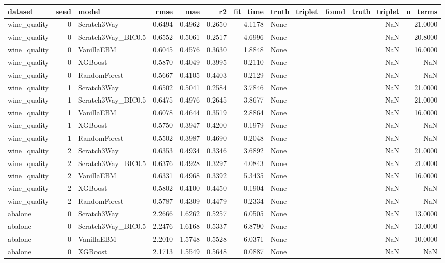 \begin{tabular}{lrlrrrrlrr}
\toprule
dataset & seed & model & rmse & mae & r2 & fit_time & truth_triplet & found_truth_triplet & n_terms \\
\midrule
wine_quality & 0 & Scratch3Way & 0.6494 & 0.4962 & 0.2650 & 4.1178 & None & NaN & 21.0000 \\
wine_quality & 0 & Scratch3Way_BIC0.5 & 0.6552 & 0.5061 & 0.2517 & 4.6996 & None & NaN & 20.8000 \\
wine_quality & 0 & VanillaEBM & 0.6045 & 0.4576 & 0.3630 & 1.8848 & None & NaN & 16.0000 \\
wine_quality & 0 & XGBoost & 0.5870 & 0.4049 & 0.3995 & 0.2110 & None & NaN & NaN \\
wine_quality & 0 & RandomForest & 0.5667 & 0.4105 & 0.4403 & 0.2129 & None & NaN & NaN \\
wine_quality & 1 & Scratch3Way & 0.6502 & 0.5041 & 0.2584 & 3.7846 & None & NaN & 21.0000 \\
wine_quality & 1 & Scratch3Way_BIC0.5 & 0.6475 & 0.4976 & 0.2645 & 3.8677 & None & NaN & 21.0000 \\
wine_quality & 1 & VanillaEBM & 0.6078 & 0.4644 & 0.3519 & 2.8864 & None & NaN & 16.0000 \\
wine_quality & 1 & XGBoost & 0.5750 & 0.3947 & 0.4200 & 0.1979 & None & NaN & NaN \\
wine_quality & 1 & RandomForest & 0.5502 & 0.3987 & 0.4690 & 0.2048 & None & NaN & NaN \\
wine_quality & 2 & Scratch3Way & 0.6353 & 0.4934 & 0.3346 & 3.6892 & None & NaN & 21.0000 \\
wine_quality & 2 & Scratch3Way_BIC0.5 & 0.6376 & 0.4928 & 0.3297 & 4.0843 & None & NaN & 21.0000 \\
wine_quality & 2 & VanillaEBM & 0.6331 & 0.4968 & 0.3392 & 5.3435 & None & NaN & 16.0000 \\
wine_quality & 2 & XGBoost & 0.5802 & 0.4100 & 0.4450 & 0.1904 & None & NaN & NaN \\
wine_quality & 2 & RandomForest & 0.5787 & 0.4309 & 0.4479 & 0.2334 & None & NaN & NaN \\
abalone & 0 & Scratch3Way & 2.2666 & 1.6262 & 0.5257 & 6.0505 & None & NaN & 13.0000 \\
abalone & 0 & Scratch3Way_BIC0.5 & 2.2476 & 1.6168 & 0.5337 & 6.8790 & None & NaN & 13.0000 \\
abalone & 0 & VanillaEBM & 2.2010 & 1.5748 & 0.5528 & 6.0371 & None & NaN & 10.0000 \\
abalone & 0 & XGBoost & 2.1713 & 1.5549 & 0.5648 & 0.0887 & None & NaN & NaN \\

\end{tabular}

